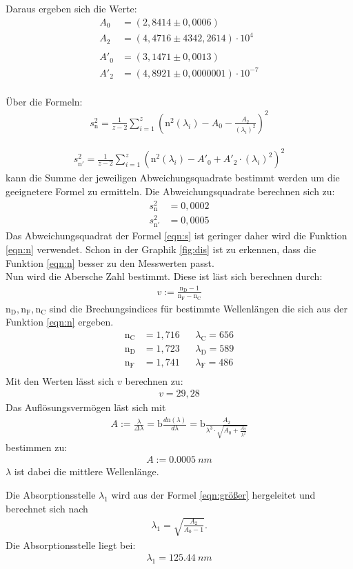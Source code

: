 Daraus ergeben sich die Werte:
\begin{align*}
  A_0&=(2,8414\pm0,0006 )\\
  A_2&=(4,4716\pm4342,2614)\cdot10^4\\\\
  A'_0&=(3,1471 \pm0,0013)\\
  A'_2&=(4,8921\pm0,0000001)\cdot10^{-7}\\
\end{align*}

Über die Formeln:
\begin{align}
  s^2_{\text{n}}=\frac{1}{z-2}\sum_{i=1}^z\left(\text{n}^2(\lambda_i)-A_0-\frac{A_2}{(\lambda_i)^2}\right)^2
  \label{eqn:s}
\end{align}

\begin{align*}
  s^2_{\text{n}'}=\frac{1}{z-2}\sum_{i=1}^z\left(\text{n}^2(\lambda_i)-A'_0+A'_2\cdot(\lambda_i)^2\right)^2
\end{align*}
kann die Summe der jeweiligen Abweichungsquadrate bestimmt werden um die geeignetere Formel zu ermitteln.
Die Abweichungsquadrate berechnen sich zu:
\begin{align*}
  s^2_{\text{n}}&=0,0002\\
  s^2_{\text{n}'}&=0,0005
\end{align*}
Das Abweichungsquadrat der Formel \ref{eqn:s} ist geringer daher wird die Funktion \ref{eqn:n} verwendet.
Schon in der Graphik \ref{fig:dis} ist zu erkennen, dass die Funktion \ref{eqn:n} besser zu den Messwerten passt.\\
Nun wird die Abersche Zahl bestimmt. Diese ist läst sich berechnen durch:
\begin{align*}
  v:=\frac{\text{n}_\text{D}-1}{\text{n}_\text{F}-\text{n}_\text{C}}
\end{align*}
$\text{n}_\text{D}, \text{n}_\text{F}, \text{n}_\text{C}$ sind die Brechungsindices für bestimmte Wellenlängen die sich aus der Funktion \ref{eqn:n} ergeben.
\begin{align*}
\text{n}_\text{C}&=1,716&&\lambda_\text{C}=656\\
\text{n}_\text{D}&=1,723&&\lambda_\text{D}=589\\
\text{n}_\text{F}&=1,741&&\lambda_\text{F}=486\\
\end{align*}
Mit den Werten lässt sich $v$ berechnen zu:
\begin{align*}
  v=29,28
\end{align*}
Das Auflösungsvermögen läst sich mit
\begin{align*}
  A:=\frac{\lambda}{\Delta\lambda}=\text{b}\frac{d\text{n}(\lambda)}{d\lambda}=\text{b}\frac{A_2}{\lambda^3\cdot\sqrt{A_0+\frac{A_2}{\lambda^2}}}
\end{align*}
bestimmen zu:
\begin{align*}
  A:=\SI{0,0005}{nm}
\end{align*}
$\lambda$ ist dabei die mittlere Wellenlänge.

Die Absorptionsstelle $\lambda_1$ wird aus der Formel \ref{eqn:größer} hergeleitet und berechnet sich nach
\begin{align*}
  \lambda_1=\sqrt{\frac{A_2}{A_0-1}}.
\end{align*}
Die Absorptionsstelle liegt bei:
\begin{align*}
  \lambda_1=\SI{125,44}{nm}
\end{align*}
